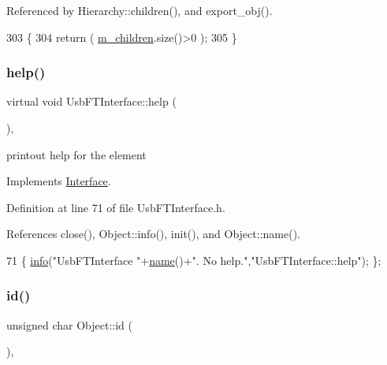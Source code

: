 Referenced by Hierarchy\+::children(), and export\+\_\+obj().


\begin{DoxyCode}
303                               \{
304   \textcolor{keywordflow}{return} ( \hyperlink{classHierarchy_a038816763941fd4a930504917f60483b}{m\_children}.size()>0 );
305 \}
\end{DoxyCode}
\mbox{\label{classUsbFTInterface_a91a0046390c76ca8abaa330fa244279c}} 
\subsubsection{\texorpdfstring{help()}{help()}}
{\footnotesize\ttfamily virtual void Usb\+F\+T\+Interface\+::help (\begin{DoxyParamCaption}{ }\end{DoxyParamCaption})\hspace{0.3cm}{\ttfamily [inline]}, {\ttfamily [virtual]}}

printout help for the element 

Implements \hyperlink{classInterface_aedd3cf1d964c837e7848ccf81dc9c760}{Interface}.



Definition at line 71 of file Usb\+F\+T\+Interface.\+h.



References close(), Object\+::info(), init(), and Object\+::name().


\begin{DoxyCode}
71 \{ \hyperlink{classObject_a644fd329ea4cb85f54fa6846484b84a8}{info}(\textcolor{stringliteral}{"UsbFTInterface "}+\hyperlink{classObject_a300f4c05dd468c7bb8b3c968868443c1}{name}()+\textcolor{stringliteral}{". No help."},\textcolor{stringliteral}{"UsbFTInterface::help"}); \};
\end{DoxyCode}
\mbox{\label{classObject_af99145335cc61ff6e2798ea17db009d2}} 
\subsubsection{\texorpdfstring{id()}{id()}}
{\footnotesize\ttfamily unsigned char Object\+::id (\begin{DoxyParamCaption}{ }\end{DoxyParamCaption})\hspace{0.3cm}{\ttfamily [inline]}, {\ttfamily [inherited]}}



